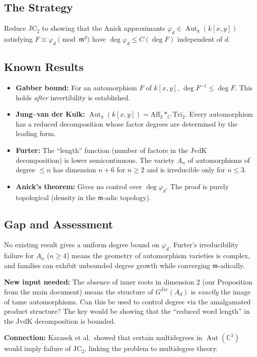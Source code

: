 \documentclass[12pt,a4paper]{article}
\theoremstyle{definition}
\newcommand{\CC}{\mathbb{C}}
\newcommand{\kk}{k}
\newcommand{\pp}{\mathfrak{m}}
\newcommand{\Aut}{\operatorname{Aut}}
\newcommand{\GJac}{G^{\mathrm{Jac}}}
\begin{document}
\subsection{The Strategy}
Reduce JC$_2$ to showing that the Anick approximants $\varphi_d \in \Aut_\kk(\kk[x,y])$
satisfying $F \equiv \varphi_d \pmod{\pp^d}$ have $\deg \varphi_d \leq C(\deg F)$
independent of $d$.

\subsection{Known Results}
\begin{itemize}
\item \textbf{Gabber bound:} For an automorphism $F$ of $\kk[x,y]$,
  $\deg F^{-1} \leq \deg F$. This holds \emph{after} invertibility is established.
\item \textbf{Jung--van der Kulk:} $\Aut_\kk(\kk[x,y]) = \mathrm{Aff}_2 *_C \mathrm{Tri}_2$.
  Every automorphism has a reduced decomposition whose factor degrees are determined
  by the leading form.
\item \textbf{Furter:} The ``length'' function (number of factors in the JvdK
  decomposition) is lower semicontinuous. The variety $A_n$ of automorphisms of
  degree $\leq n$ has dimension $n + 6$ for $n \geq 2$ and is irreducible only
  for $n \leq 3$.
\item \textbf{Anick's theorem:} Gives no control over $\deg \varphi_d$. The proof
  is purely topological (density in the $\pp$-adic topology).
\end{itemize}

\subsection{Gap and Assessment}
No existing result gives a uniform degree bound on $\varphi_d$. Furter's
irreducibility failure for $A_n$ ($n \geq 4$) means the geometry of automorphism
varieties is complex, and families can exhibit unbounded degree growth while
converging $\pp$-adically.

\textbf{New input needed:} The absence of inner roots in dimension 2
(our Proposition from the main document) means the structure of $\GJac(A_d)$
is \emph{exactly} the image of tame automorphisms. Can this be used to control
degree via the amalgamated product structure? The key would be showing that
the ``reduced word length'' in the JvdK decomposition is bounded.

\textbf{Connection:} Karasek et al.\ showed that certain multidegrees in
$\Aut(\CC^3)$ would imply failure of JC$_2$, linking the problem to multidegree
theory.
\end{document}
